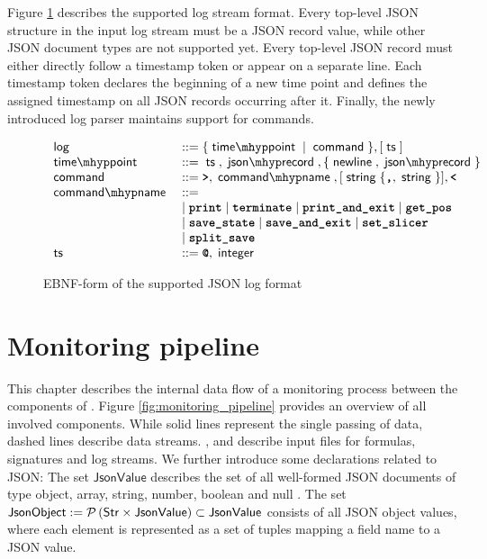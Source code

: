 Figure \ref{fig:json_log_ebnf} describes the supported log stream format. Every top-level JSON structure in the input log stream must be a JSON record value, while other JSON document types are not supported yet. Every top-level JSON record must either directly follow a timestamp token or appear on a separate line. Each timestamp token declares the beginning of a new time point and defines the assigned timestamp on all JSON records occurring after it.
Finally, the newly introduced log parser maintains support for \MonPoly commands.

\begin{figure}
	\[
		\begin{array}{lll}
			\ebnfr{log}                & ::=  \{ \ebnfr{time \mhyp point} \mid \ebnfr{command} \}, [\ebnfr{ts}]                                    \\
			\ebnfr{time \mhyp point}   & ::=  \ebnfr{ts}, \ebnfr{json \mhyp record}, \{ \ebnfr{newline}, \ebnfr{json \mhyp record} \}              \\
			\ebnfr{command}            & ::=  \ebnft{>}, \ebnfr{command \mhyp name}, [ \ebnfr{string} \{ \ebnft{,}, \ebnfr{string} \} ], \ebnft{<} \\
			\ebnfr{command \mhyp name} & ::=                                                                                                       \\ & \mid \ebnft{print} \mid \ebnft{terminate} \mid \ebnft{print\_and\_exit} \mid \ebnft{get\_pos}             \\
			                           & \mid \ebnft{save\_state} \mid \ebnft{save\_and\_exit} \mid \ebnft{set\_slicer}                            \\ & \mid \ebnft{split\_save} \\
			\ebnfr{ts}                 & ::=  \ebnft{@}, \ebnfr{integer}                                                                           \\
		\end{array}
	\]
	\caption{EBNF-form of the supported JSON log format}
	\label{fig:json_log_ebnf}
\end{figure}

\section{Monitoring pipeline}

This chapter describes the internal data flow of a monitoring process between the components of \MonPolyN. Figure \ref{fig:monitoring_pipeline} provides an overview of all involved components. While solid lines represent the single passing of data, dashed lines describe data streams. ,  and  describe input files for formulas, signatures and log streams. We further introduce some declarations related to JSON: The set $\mathsf{JsonValue}$ describes the set of all well-formed JSON documents of type object, array, string, number, boolean and null \cite{pezoaFoundationsJSONSchema2016}. The set $\mathsf{JsonObject} := \mathcal{P}\left( \mathsf{Str} \times \mathsf{JsonValue} \right) \subset \mathsf{JsonValue}$ consists of all JSON object values, where each element is represented as a set of tuples mapping a field name to a JSON value.

